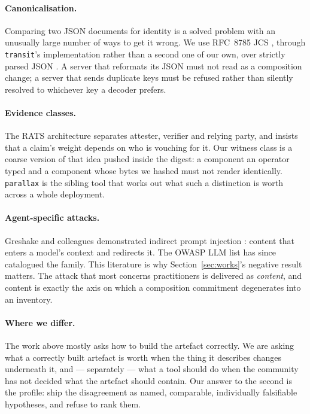 \documentclass[11pt]{article}
\newcommand{\transit}{\texttt{transit}}
\newcommand{\parallax}{\texttt{parallax}}
\begin{document}
\paragraph{Canonicalisation.} Comparing two JSON documents for identity is a
solved problem with an unusually large number of ways to get it wrong. We use
RFC~8785 JCS \cite{rfc8785}, through \transit's implementation
\cite{transittool} rather than a second one of our own, over strictly parsed
JSON \cite{rfc8259,rfc7493}. A server that reformats its JSON must not read
as a composition change; a server that sends duplicate keys must be refused
rather than silently resolved to whichever key a decoder prefers.

\paragraph{Evidence classes.} The RATS architecture \cite{rfc9334} separates
attester, verifier and relying party, and insists that a claim's weight
depends on who is vouching for it. Our witness class is a coarse version of
that idea pushed inside the digest: a component an operator typed and a
component whose bytes we hashed must not render identically. \parallax{}
\cite{parallaxtool} is the sibling tool that works out what such a
distinction is worth across a whole deployment.

\paragraph{Agent-specific attacks.} Greshake and colleagues demonstrated
indirect prompt injection \cite{greshake2023}: content that enters a model's
context and redirects it. The OWASP LLM list \cite{owaspllm} has since
catalogued the family. This literature is why Section~\ref{sec:works}'s
negative result matters. The attack that most concerns practitioners is
delivered as \emph{content}, and content is exactly the axis on which a
composition commitment degenerates into an inventory.

\paragraph{Where we differ.} The work above mostly asks how to build the
artefact correctly. We are asking what a correctly built artefact is worth
when the thing it describes changes underneath it, and --- separately --- what
a tool should do when the community has not decided what the artefact should
contain. Our answer to the second is the profile: ship the disagreement as
named, comparable, individually falsifiable hypotheses, and refuse to rank
them.
\end{document}

